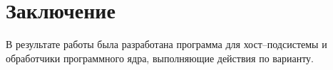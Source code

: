\chapter{Заключение}

В результате работы была разработана программа для хост--подсистемы и обработчики программного ядра, выполняющие действия по варианту.
